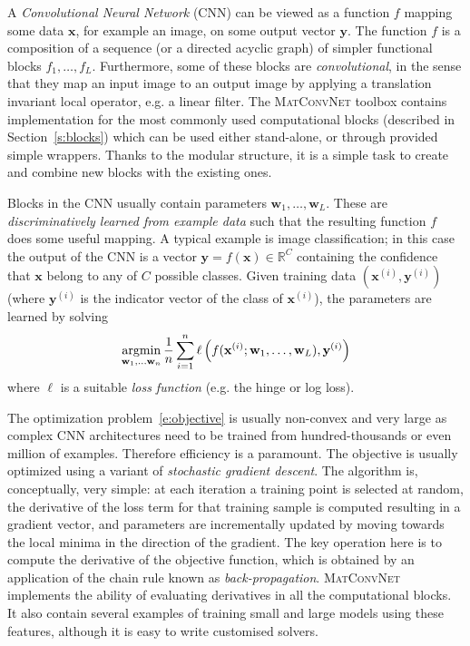 \documentclass[12pt]{article}
\newcommand{\real}{\mathbb{R}}
\newcommand{\vlnn}{\textsc{MatConvNet}\xspace}
\newcommand{\bx}{\mathbf{x}}
\newcommand{\by}{\mathbf{y}}
\newcommand{\bw}{\mathbf{w}}
\newcommand{\argmin}{\operatornamewithlimits{argmin}}
\begin{document}
A \emph{Convolutional Neural Network} (CNN) can be viewed as a function $f$ mapping some data $\bx$, for example an image, on some output vector $\by$. The function $f$ is a composition of a sequence (or a directed acyclic graph) of simpler functional blocks $f_1,\dots,f_L$. Furthermore, some of these blocks are \emph{convolutional}, in the sense that they map an input image to an output image by applying a translation invariant local operator, e.g. a linear filter. The \vlnn toolbox contains implementation for the most commonly used computational blocks (described in Section~\ref{s:blocks}) which can be used either stand-alone, or through provided simple wrappers. Thanks to the modular structure, it is a simple task to create and combine new blocks with the existing ones. %

Blocks in the CNN usually contain parameters $\bw_1,\dots,\bw_L$. These are \emph{discriminatively learned from example data} such that the resulting function $f$ does some useful mapping. A typical example is image classification; in this case the output of the CNN is a vector $\by=f(\bx)\in\real^C$ containing the confidence that $\bx$ belong to any of $C$ possible classes. Given training data $(\bx^{(i)},\by^{(i)})$ (where $\by^{(i)}$ is the indicator vector of the class of $\bx^{(i)}$), the parameters are learned by solving
\begin{equation}\label{e:objective}
 \argmin_{\bw_1,\dots\bw_n}
 \frac{1}{n}\sum_{i=1}^n
 \ell\left(
 f(\bx^{(i)};\bw_1,\dots,\bw_L),
 \by^{(i)}
 \right)
\end{equation}
where $\ell$ is a suitable \emph{loss function} (e.g. the hinge or log loss).

The optimization problem~\eqref{e:objective} is usually non-convex and very large as complex CNN architectures need to be trained from hundred-thousands or even million of examples. Therefore efficiency is a paramount. The objective is usually optimized using a variant of \emph{stochastic gradient descent}. The algorithm is, conceptually, very simple: at each iteration a training point is selected at random, the derivative of the loss term for that training sample is computed resulting in a gradient vector, and parameters are incrementally updated by moving towards the local minima in the direction of the gradient. The key operation here is to compute the derivative of the objective function, which is obtained by an application of the chain rule known as \emph{back-propagation}. \vlnn implements the ability of evaluating derivatives in all the computational blocks. It also contain several examples of training small and large models using these features, although it is easy to write customised solvers.
\end{document}

